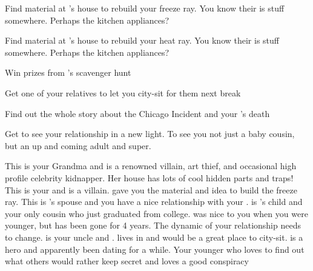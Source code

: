\documentclass[char]{LRSguildcamp1}
\begin{document}
 
\begin{itemz}[Goals]
	\item Find material at \cGrandma{}'s house to rebuild your freeze ray. You know their is stuff somewhere. Perhaps the kitchen appliances? 
		\item Find material at \cGrandma{}'s house to rebuild your heat ray. You know their is stuff somewhere. Perhaps the kitchen appliances? 
		\item Win prizes from \cGrandma{}'s scavenger hunt
		\item Get one of your relatives to let you city-sit for them next break
		\item Find out the whole story about the Chicago Incident and your \cAS{\parent}'s death
		\item Get \cGrad{} to see your relationship in a new light. To see you not just a baby cousin, but an up and coming adult and super.
\end{itemz}

\begin{itemz}[Notes]
	\item 
\end{itemz}
\begin{contacts}
	\contact{\cGrandma{}} This is your Grandma and is a renowned villain, art thief, and occasional high profile celebrity kidnapper. Her house has lots of cool hidden parts and traps!
	\contact{\cOldest{}} This is your  \cOldest{\uncle} and is a villain.  gave you the material and idea to build the freeze ray.
	\contact{\cOS{}} This is \cOldest{}'s spouse and you have a nice relationship with your \cOS{\uncle}.
	\contact{\cGrad{}} \cGrad{} is \cOldest{}'s child and your only cousin who just graduated from college. \cGrad{} was nice to you when you were younger, but has been gone for 4 years. The dynamic of your relationship needs to change. 
	\contact{\cYoungest{}} \cYoungest{} is your uncle and \cYoungest{\hero}. \cYoungest{} lives in \pCityYoungest{} and would be a great place to city-sit.  
	\contact{\cYS{}} \cYS{} is a hero and apparently been dating \cYoungest{} for a while. 
	 	\contact{\cTween{}} Your younger \cTween{\sibling} who loves to find out what others would rather keep secret and loves a good conspiracy 
\end{contacts}
\end{document}
